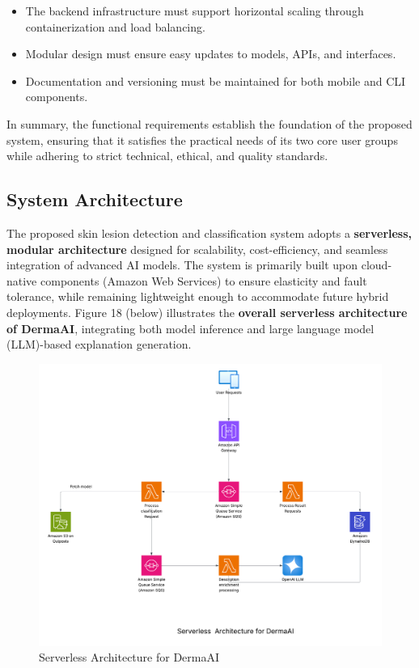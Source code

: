 \documentclass[
  12pt,
  oneside]{article}
\providecommand{\tightlist}{%
  \setlength{\itemsep}{0pt}\setlength{\parskip}{0pt}}
\begin{document}
\begin{itemize}
\tightlist
\item
  The backend infrastructure must support horizontal scaling through
  containerization and load balancing.\\
\item
  Modular design must ensure easy updates to models, APIs, and
  interfaces.\\
\item
  Documentation and versioning must be maintained for both mobile and
  CLI components.
\end{itemize}

In summary, the functional requirements establish the foundation of the
proposed system, ensuring that it satisfies the practical needs of its
two core user groups while adhering to strict technical, ethical, and
quality standards.

\subsection{System Architecture}\label{system-architecture}

The proposed skin lesion detection and classification system adopts a
\textbf{serverless, modular architecture} designed for scalability,
cost-efficiency, and seamless integration of advanced AI models. The
system is primarily built upon cloud-native components (Amazon Web
Services) to ensure elasticity and fault tolerance, while remaining
lightweight enough to accommodate future hybrid deployments. Figure 18
(below) illustrates the \textbf{overall serverless architecture of
DermaAI}, integrating both model inference and large language model
(LLM)-based explanation generation.

\begin{figure}

{\centering \includegraphics[width=0.5\linewidth]{DermaAI-Architecture} 

}

\caption{Serverless Architecture for DermaAI}\label{fig:unnamed-chunk-15}
\end{figure}
\end{document}
